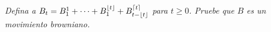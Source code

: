 \emph{
    Defina a $B_t=B^1_1+\cdots+B^{\lfloor t\rfloor}_1+B^{\lceil t \rceil}_{t-\lfloor t\rfloor}$ 
    para $t\geq 0$. Pruebe que $B$ es un movimiento browniano.
}
\afterstatement\pn